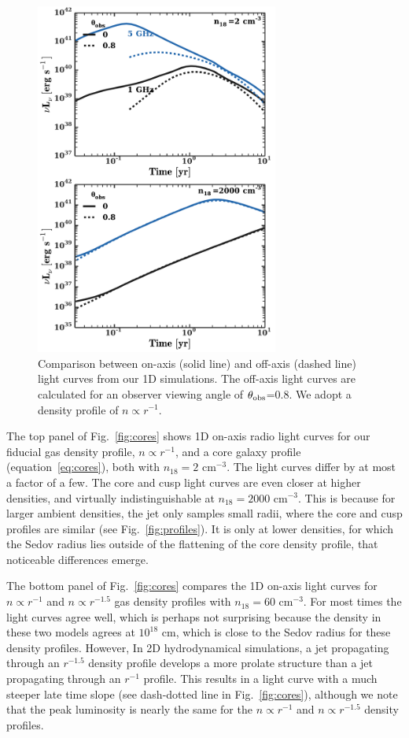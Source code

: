\documentclass[usenatbib,fleqn]{mnras}
\begin{document}
\begin{figure}
\includegraphics[width=8cm]{on_off.pdf}
\caption{\label{fig:onOff} Comparison between on-axis (solid line) and
  off-axis (dashed line) light curves from our 1D simulations.  The
  off-axis light curves are calculated for an observer viewing angle
  of $\theta_{\rm obs}$=0.8.  We adopt a density profile of $n\propto
  r^{-1}$.}
\end{figure}

\label{sec:profileComp}
The top panel of Fig.~\ref{fig:cores} shows 1D on-axis radio light
curves for our fiducial gas density profile, $n\propto r^{-1}$, and a
core galaxy profile (equation~\ref{eq:cores}), both with $n_{18}=2$
cm$^{-3}$.  The light curves differ by at most a factor of a few. The
core and cusp light curves are even closer at higher densities, and
virtually indistinguishable at $n_{18}=2000$ cm$^{-3}$. This is
because for larger ambient densities, the jet only samples small
radii, where the core and cusp profiles are similar (see
Fig.~\ref{fig:profiles}). It is only at lower densities, for which the
Sedov radius lies outside of the flattening of the core density
profile, that noticeable differences emerge.

The bottom panel of Fig.~\ref{fig:cores} compares the 1D on-axis light
curves for $n\propto r^{-1}$ and $n\propto r^{-1.5}$ gas density
profiles with $n_{18}=60$ cm$^{-3}$. For most times the light curves
agree well, which is perhaps not surprising because the density in
these two models agrees at $10^{18}$ cm, which is close to the Sedov
radius for these density profiles. However, In 2D hydrodynamical
simulations, a jet propagating through an $r^{-1.5}$ density profile
develops a more prolate structure than a jet propagating through an
$r^{-1}$ profile. This results in a light curve with a much steeper
late time slope (see dash-dotted line in Fig.~\ref{fig:cores}),
although we note that the peak luminosity is nearly the same for the
$n\propto r^{-1}$ and $n\propto r^{-1.5}$ density profiles.
\end{document}
